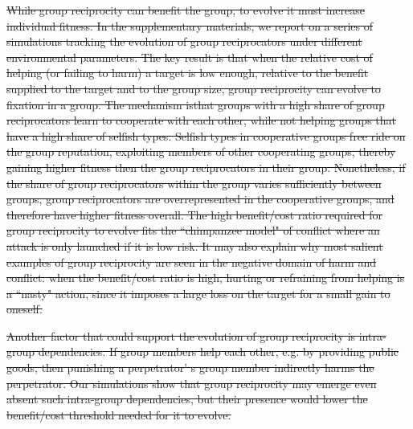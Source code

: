 \documentclass[12pt,a4paper]{article}\usepackage[]{graphicx}\usepackage[]{color}
\providecommand{\DIFdeltex}[1]{{\protect\color{red}\sout{#1}}}                      %
\providecommand{\DIFdelbegin}{} %
\providecommand{\DIFdel}[1]{\texorpdfstring{\DIFdeltex{#1}}{}} %
\begin{document}
\DIFdelbegin \DIFdel{While group reciprocity can benefit the group, to evolve it must increase individual fitness. In the
supplementary materials, we report on a series of simulations tracking the evolution of group reciprocators under different
environmental parameters. The key result is that when the relative cost of helping (or failing to harm) a target is low
enough, relative to the benefit supplied to the target and to the group size, group reciprocity can evolve to fixation in a group.
The mechanism isthat groups 
with a high share of group
reciprocators learn to cooperate with each other, while not helping groups that have a high share of selfish types. 
Selfish types in cooperative groups free ride on the group reputation, exploiting members of other cooperating groups, thereby gaining higher fitness then the group reciprocators in their group. Nonetheless, if the share of group reciprocators within the group varies sufficiently between groups, group reciprocators 
are overrepresented in the cooperative groups, and therefore have higher fitness overall. The high benefit/cost ratio required for
group reciprocity to evolve fits the ``chimpanzee model" of conflict where an attack is 
only launched if it is low risk. It may also explain why most salient examples of group reciprocity are seen in the
negative domain of harm and conflict: when the benefit/cost ratio is high, hurting or refraining from helping is a ``nasty" action, 
since it imposes a large loss on the target for a small gain to oneself.
}%

\DIFdel{Another factor that could support the evolution of group reciprocity is intra-group dependencies. If group members help 
each other, e.g. by providing public goods, then punishing a perpetrator' s group member indirectly harms the perpetrator.
Our simulations show that group reciprocity may emerge even absent such intra-group dependencies, but their presence
would lower the benefit/cost threshold needed for it to evolve.
}%
\end{document}
